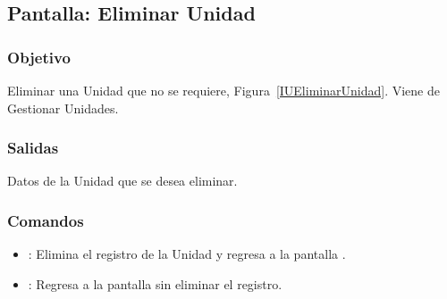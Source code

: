 \subsection{Pantalla: Eliminar Unidad}

\subsubsection{Objetivo}
Eliminar una Unidad que no se requiere, Figura~\ref{IUEliminarUnidad}. Viene de Gestionar Unidades.


\subsubsection{Salidas}
Datos de la Unidad que se desea eliminar.

\subsubsection{Comandos}
\begin{itemize}
 \item {}: Elimina el registro de la Unidad y regresa a la pantalla . 
 \item {}: Regresa a la pantalla  sin eliminar el registro.
\end{itemize}




